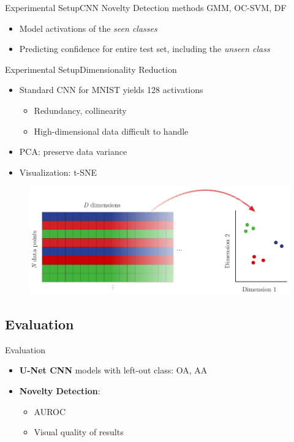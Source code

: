 \documentclass{beamer}
\begin{document}
\begin{frame}{Experimental Setup}{CNN}
	Novelty Detection methods \gls{GMM}, \gls{OC-SVM}, \gls{DF}
	\begin{itemize}
		\item Model activations of the \textit{seen classes}
		\item Predicting confidence for entire test set, including the \textit{unseen class}
	\end{itemize}
\end{frame}

\begin{frame}{Experimental Setup}{Dimensionality Reduction}
	\begin{itemize}
		\item Standard \gls{CNN} for \gls{MNIST} yields 128 activations\\
		\begin{itemize}
			\item Redundancy, collinearity
			\item High-dimensional data difficult to handle
		\end{itemize}
		\item \gls{PCA}: preserve data variance
		\item Visualization: \gls{t-SNE}
	\end{itemize}
	
	\begin{figure}[H]
		\centering
		\includegraphics[width=.8\textwidth]{t-SNE-schema}
	\end{figure}
\end{frame}



\subsection{Evaluation}
\begin{frame}{Evaluation}
	\begin{itemize}
		\item \textbf{U-Net \gls{CNN}} models with left-out class: \gls{OA}, \gls{AA}
		\item \textbf{Novelty Detection}:
		\begin{itemize}
			\item \gls{AUROC}
			\item Visual quality of results
		\end{itemize}
	\end{itemize}
\end{frame}
\end{document}
